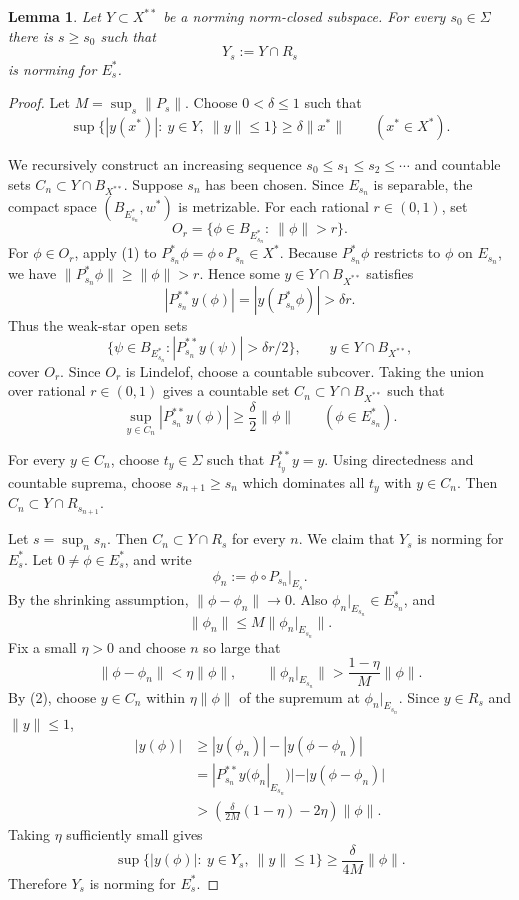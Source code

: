 \documentclass[11pt]{article}
\newtheorem{lemma}{Lemma}
\newcommand{\Ball}{B}
\begin{document}
\begin{lemma}\label{lem:localization}
Let $Y\subset X^{**}$ be a norming norm-closed subspace.  For every
$s_0\in\Sigma$ there is $s\geq s_0$ such that
\[
Y_s:=Y\cap R_s
\]
is norming for $E_s^*$.
\end{lemma}

\begin{proof}
Let $M=\sup_s\|P_s\|$.
Choose $0<\delta\leq1$ such that
\[
\sup\{|y(x^*)|:\ y\in Y,\ \|y\|\leq1\}\geq \delta\|x^*\|
\qquad (x^*\in X^*).
\tag{1}
\]

We recursively construct an increasing sequence $s_0\leq s_1\leq s_2\leq
\cdots$ and countable sets $C_n\subset Y\cap\Ball_{X^{**}}$.  Suppose $s_n$
has been chosen.  Since $E_{s_n}$ is separable, the compact space
$(\Ball_{E_{s_n}^*},w^*)$ is metrizable.  For each rational $r\in(0,1)$, set
\[
O_r=\{\phi\in\Ball_{E_{s_n}^*}:\ \|\phi\|>r\}.
\]
For $\phi\in O_r$, apply (1) to $P_{s_n}^*\phi=\phi\circ P_{s_n}\in X^*$.
Because $P_{s_n}^*\phi$ restricts to $\phi$ on $E_{s_n}$, we have
$\|P_{s_n}^*\phi\|\geq\|\phi\|>r$.  Hence some
$y\in Y\cap\Ball_{X^{**}}$ satisfies
\[
|P_{s_n}^{**}y(\phi)|=|y(P_{s_n}^*\phi)|>\delta r.
\]
Thus the weak-star open sets
\[
\{\psi\in\Ball_{E_{s_n}^*}: |P_{s_n}^{**}y(\psi)|>\delta r/2\},
\qquad y\in Y\cap\Ball_{X^{**}},
\]
cover $O_r$.  Since $O_r$ is Lindelof, choose a countable subcover.  Taking
the union over rational $r\in(0,1)$ gives a countable set
$C_n\subset Y\cap\Ball_{X^{**}}$ such that
\[
\sup_{y\in C_n}|P_{s_n}^{**}y(\phi)|
\geq \frac{\delta}{2}\|\phi\|
\qquad(\phi\in E_{s_n}^*).
\tag{2}
\]

For every $y\in C_n$, choose $t_y\in\Sigma$ such that $P_{t_y}^{**}y=y$.
Using directedness and countable suprema, choose $s_{n+1}\geq s_n$ which
dominates all $t_y$ with $y\in C_n$.  Then $C_n\subset Y\cap R_{s_{n+1}}$.

Let $s=\sup_n s_n$.  Then $C_n\subset Y\cap R_s$ for every $n$.  We claim that
$Y_s$ is norming for $E_s^*$.  Let $0\neq\phi\in E_s^*$, and write
\[
\phi_n:=\phi\circ P_{s_n}|_{E_s}.
\]
By the shrinking assumption, $\|\phi-\phi_n\|\to0$.  Also
$\phi_n|_{E_{s_n}}\in E_{s_n}^*$, and
\[
\|\phi_n\|\leq M\|\phi_n|_{E_{s_n}}\|.
\]
Fix a small $\eta>0$ and choose $n$ so large that
\[
\|\phi-\phi_n\|<\eta\|\phi\|,
\qquad
\|\phi_n|_{E_{s_n}}\|>\frac{1-\eta}{M}\|\phi\|.
\]
By (2), choose $y\in C_n$ within $\eta\|\phi\|$ of the supremum at
$\phi_n|_{E_{s_n}}$.  Since $y\in R_s$ and $\|y\|\leq1$,
\[
\begin{aligned}
|y(\phi)|
&\geq |y(\phi_n)|-|y(\phi-\phi_n)|\\
&= |P_{s_n}^{**}y(\phi_n|_{E_{s_n}})|-|y(\phi-\phi_n)|\\
&> \left(\frac{\delta}{2M}(1-\eta)-2\eta\right)\|\phi\|.
\end{aligned}
\]
Taking $\eta$ sufficiently small gives
\[
\sup\{|y(\phi)|:\ y\in Y_s,\ \|y\|\leq1\}\geq \frac{\delta}{4M}\|\phi\|.
\]
Therefore $Y_s$ is norming for $E_s^*$.
\end{proof}
\end{document}
